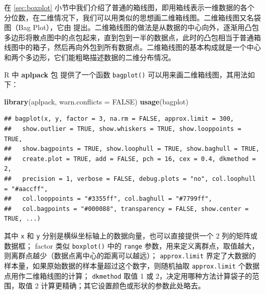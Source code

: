 \documentclass[
  b5paper,
  UTF8,twoside]{book}
\newenvironment{Shaded}{\begin{snugshade}}{\end{snugshade}}
\newcommand{\AttributeTok}[1]{\textcolor[rgb]{0.13,0.29,0.53}{#1}}
\newcommand{\ConstantTok}[1]{\textcolor[rgb]{0.56,0.35,0.01}{#1}}
\newcommand{\FunctionTok}[1]{\textcolor[rgb]{0.13,0.29,0.53}{\textbf{#1}}}
\newcommand{\NormalTok}[1]{#1}
\begin{document}
在 \ref{sec:boxplot} 小节中我们介绍了普通的箱线图，即用箱线表示一维数据的各个分位数，在二维情况下，我们可以用类似的思想画二维箱线图。二维箱线图又名袋图（Bag Plot），它由 \citet{Rousseeuw99} 提出。二维箱线图的做法是从数据的中心向外，逐渐用凸包多边形将散点图中的点包起来，直到包到一半的数据点，此时的凸包相当于普通箱线图中的箱子，然后再向外包到所有数据点。二维箱线图的基本构成就是一个中心和两个多边形，它们能粗略描述数据的二维分布情况。

R 中 \textbf{aplpack} 包 \citep{aplpack} 提供了一个函数 \texttt{bagplot()} 可以用来画二维箱线图，其用法如下：

\begin{Shaded}
\begin{Highlighting}[]
\FunctionTok{library}\NormalTok{(aplpack, }\AttributeTok{warn.conflicts =} \ConstantTok{FALSE}\NormalTok{)}
\FunctionTok{usage}\NormalTok{(bagplot)}
\end{Highlighting}
\end{Shaded}

\begin{verbatim}
## bagplot(x, y, factor = 3, na.rm = FALSE, approx.limit = 300,
##   show.outlier = TRUE, show.whiskers = TRUE, show.looppoints = TRUE,
##   show.bagpoints = TRUE, show.loophull = TRUE, show.baghull = TRUE,
##   create.plot = TRUE, add = FALSE, pch = 16, cex = 0.4, dkmethod = 2,
##   precision = 1, verbose = FALSE, debug.plots = "no", col.loophull = "#aaccff",
##   col.looppoints = "#3355ff", col.baghull = "#7799ff",
##   col.bagpoints = "#000088", transparency = FALSE, show.center = TRUE, ...)
\end{verbatim}

其中 \texttt{x} 和 \texttt{y} 分别是横纵坐标轴上的数据向量，也可以直接提供一个 2 列的矩阵或数据框； factor 类似 \texttt{boxplot()} 中的 \texttt{range} 参数，用来定义离群点，取值越大，则离群点越少（数据点离中心的距离可以越远）； \texttt{approx.limit} 界定了大数据的样本量，如果原始数据的样本量超过这个数字，则随机抽取 \texttt{approx.limit} 个数据点用作二维箱线图的计算； \texttt{dkmethod} 取值 1 或 2，决定用哪种方法计算袋子的范围，取值 2 计算更精确；其它设置颜色或形状的参数此处略去。
\end{document}
